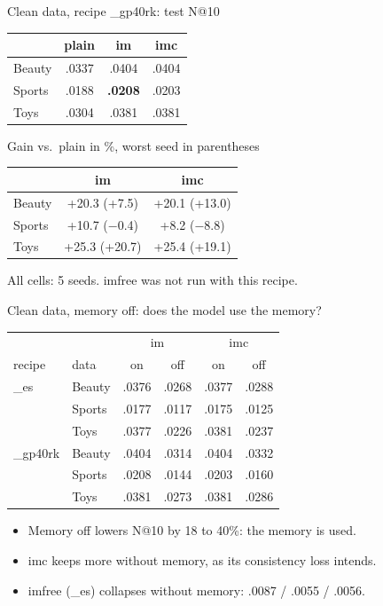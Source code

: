 \documentclass{beamer}
\newcommand{\up}[1]{\textcolor{green!45!black}{#1}}
\newcommand{\dn}[1]{\textcolor{red!70!black}{#1}}
\begin{document}
\begin{frame}{Clean data, recipe \_gp40rk: test N@10}
\centering
\begin{tabular}{lccc}
\toprule
        & plain & im & imc \\
\midrule
Beauty  & .0337 & .0404 & .0404 \\
Sports  & .0188 & \textbf{.0208} & .0203 \\
Toys    & .0304 & .0381 & .0381 \\
\bottomrule
\end{tabular}

\medskip
{\small Gain vs.\ plain in \%, worst seed in parentheses}\par\smallskip
\begin{tabular}{lcc}
\toprule
       & im & imc \\
\midrule
Beauty & \up{+20.3} (+7.5)  & \up{+20.1} (+13.0) \\
Sports & \up{+10.7} (\dn{$-$0.4}) & \up{+8.2} (\dn{$-$8.8}) \\
Toys   & \up{+25.3} (+20.7) & \up{+25.4} (+19.1) \\
\bottomrule
\end{tabular}

\bigskip
\footnotesize All cells: 5 seeds. imfree was not run with this recipe.
\end{frame}

\begin{frame}{Clean data, memory off: does the model use the memory?}
\centering
\small
\begin{tabular}{llcccc}
\toprule
       &        & \multicolumn{2}{c}{im} & \multicolumn{2}{c}{imc} \\
recipe & data   & on & off & on & off \\
\midrule
\_es     & Beauty & .0376 & .0268 & .0377 & .0288 \\
         & Sports & .0177 & .0117 & .0175 & .0125 \\
         & Toys   & .0377 & .0226 & .0381 & .0237 \\
\midrule
\_gp40rk & Beauty & .0404 & .0314 & .0404 & .0332 \\
         & Sports & .0208 & .0144 & .0203 & .0160 \\
         & Toys   & .0381 & .0273 & .0381 & .0286 \\
\bottomrule
\end{tabular}

\medskip
\begin{itemize}\footnotesize
  \item Memory off lowers N@10 by 18 to 40\%: the memory is used.
  \item imc keeps more without memory, as its consistency loss intends.
  \item imfree (\_es) collapses without memory: .0087 / .0055 / .0056.
\end{itemize}
\end{frame}
\end{document}
